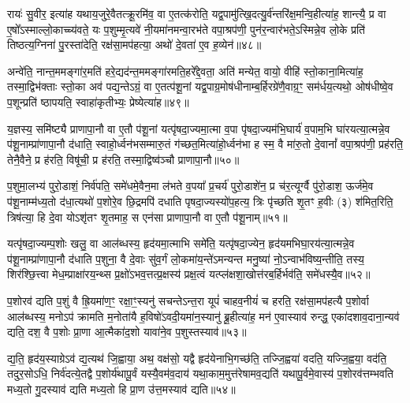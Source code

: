 रायः॑ सु॒वीर॒ इत्या॑ह यथाय॒जुरे॒वैतत्क्रू॒रमि॑व॒ वा ए॒तत्क॑रोति॒ यद्व॒पामु॑त्खि॒दत्यु॒र्व॑न्तरि॑क्ष॒मन्वि॒हीत्या॑ह॒ शान्त्यै॒ प्र वा ए॒षो᳚\-ऽस्माल्लो॒काच्च्य॑वते॒ यः प॒शुम्मृ॒त्यवे॑ नी॒यमा॑नमन्वा॒रभ॑ते वपा॒श्रप॑णी॒ पुन॑र॒न्वार॑भते॒\-ऽस्मिन्ने॒व लो॒के प्रति॑ तिष्ठत्य॒ग्निना॑ पु॒रस्ता॑देति॒ रक्ष॑सा॒मप॑हत्या॒ अथो॑ दे॒वता॑ ए॒व ह॒व्येन॑॥४८॥

अन्वे॑ति॒ नान्त॒ममङ्गा॑र॒मति॑ हरे॒द्यद॑न्त॒ममङ्गा॑रमति॒हरे᳚द्दे॒वता॒ अति॑ मन्येत॒ वायो॒ वीहि॑ स्तो॒काना॒मित्या॑ह॒ तस्मा॒द्विभ॑क्ताः स्तो॒का अव॑ पद्य॒न्ते\-ऽग्रं॒ वा ए॒तत्प॑शू॒नां यद्व॒पाग्र॒मोष॑धीनाम्ब॒र्\mbox{}हिरग्रे॑णै॒वाग्र॒ꣳ॒ सम॑र्धय॒त्यथो॒ ओष॑धीष्वे॒व प॒शून्प्रति॑ ष्ठापयति॒ स्वाहा॑कृतीभ्यः॒ प्रेष्येत्या॑ह॥४९॥

य॒ज्ञस्य॒ समि॑ष्ट्यै प्राणापा॒नौ वा ए॒तौ प॑शू॒नां यत्पृ॑षदा॒ज्यमा॒त्मा व॒पा पृ॑षदा॒ज्यम॑भि॒घार्य॑ व॒पाम॒भि घा॑रयत्या॒त्मन्ने॒व प॑शू॒नाम्प्रा॑णापा॒नौ द॑धाति॒ स्वाहो॒र्ध्वन॑भसम्मारु॒तं ग॑च्छत॒मित्या॑हो॒र्ध्वन॑भा ह स्म॒ वै मा॑रु॒तो दे॒वानां᳚ वपा॒श्रप॑णी॒ प्रह॑रति॒ तेनै॒वैने॒ प्र ह॑रति॒ विषू॑ची॒ प्र ह॑रति॒ तस्मा॒द्विष्व॑ञ्चौ प्राणापा॒नौ॥५०॥

{\anuvakamend[{स्वधि॑तिश्चै॒वाच्छि॑न्नो ह॒व्येने॒ष्येत्या॑ह॒ षट्च॑त्वारिꣳशच्च}]}%

प॒शुमा॒लभ्य॑ पुरो॒डाशं॒ निर्व॑पति॒ समे॑धमे॒वैन॒मा ल॑भते व॒पया᳚ प्र॒चर्य॑ पुरो॒डाशे॑न॒ प्र च॑र॒त्यूर्ग्वै पु॑रो॒डाश॒ ऊर्ज॑मे॒व प॑शू॒नाम्म॑ध्य॒तो द॑धा॒त्यथो॑ प॒शोरे॒व छि॒द्रमपि॑ दधाति पृषदा॒ज्यस्यो॑प॒हत्य॒ त्रिः पृ॑च्छति शृ॒तꣳ ह॒वीः (३) श॑मित॒रिति॒ त्रिष॑त्या॒ हि दे॒वा यो\-ऽशृ॑तꣳ शृ॒तमाह॒ स एन॑सा प्राणापा॒नौ वा ए॒तौ प॑शू॒नाम्॥५१॥

यत्पृ॑षदा॒ज्यम्प॒शोः खलु॒ वा आल॑ब्धस्य॒ हृद॑यमा॒त्माभि समे॑ति॒ यत्पृ॑षदा॒ज्येन॒ हृद॑यमभिघा॒रय॑त्या॒त्मन्ने॒व प॑शू॒नाम्प्रा॑णापा॒नौ द॑धाति प॒शुना॒ वै दे॒वाः सु॑व॒र्गं लो॒कमा॑य॒न्ते॑\-ऽमन्यन्त मनु॒ष्या॑ नो॒\-ऽन्वाभ॑विष्य॒न्तीति॒ तस्य॒ शिर॑श्छि॒त्त्वा मेध॒म्प्राक्षा॑रय॒न्थ्स प्र॒क्षो॑\-ऽभव॒त्तत्प्र॒क्षस्य॑ प्रक्ष॒त्वं यत्प्ल॑क्षशा॒खोत्त॑रब॒र्\mbox{}हिर्भव॑ति॒ समे॑धस्यै॒व॥५२॥

प॒शोरव॑ द्यति प॒शुं वै ह्रि॒यमा॑ण॒ꣳ॒ रक्षा॒ꣳ॒स्यनु॑ सचन्ते\-ऽन्त॒रा यूपं॑ चाहव॒नीयं॑ च हरति॒ रक्ष॑सा॒मप॑हत्यै प॒शोर्वा आल॑ब्धस्य॒ मनो\-ऽप॑ क्रामति म॒नोता॑यै ह॒विषो॑\-ऽवदी॒यमा॑न॒स्यानु॑ ब्रू॒हीत्या॑ह॒ मन॑ ए॒वास्याव॑ रुन्द्ध॒ एका॑दशाव॒दाना॒न्यव॑ द्यति॒ दश॒ वै प॒शोः प्रा॒णा आ॒त्मैका॑द॒शो यावा॑ने॒व प॒शुस्तस्याव॑॥५३॥

द्य॒ति॒ हृद॑य॒स्याग्रे\-ऽव॑ द्य॒त्यथ॑ जि॒ह्वाया॒ अथ॒ वक्ष॑सो॒ यद्वै हृद॑येनाभि॒गच्छ॑ति॒ तज्जि॒ह्वया॑ वदति॒ यज्जि॒ह्वया॒ वद॑ति॒ तदुर॒सो\-ऽधि॒ निर्व॑दत्ये॒तद्वै प॒शोर्य॑थापू॒र्वं यस्यै॒वम॑व॒दाय॑ यथा॒काम॒मुत्त॑रेषामव॒द्यति॑ यथापू॒र्वमे॒वास्य॑ प॒शोरव॑त्तम्भवति मध्य॒तो गु॒दस्याव॑ द्यति मध्य॒तो हि प्रा॒ण उ॑त्त॒मस्याव॑ द्यति॥५४॥

